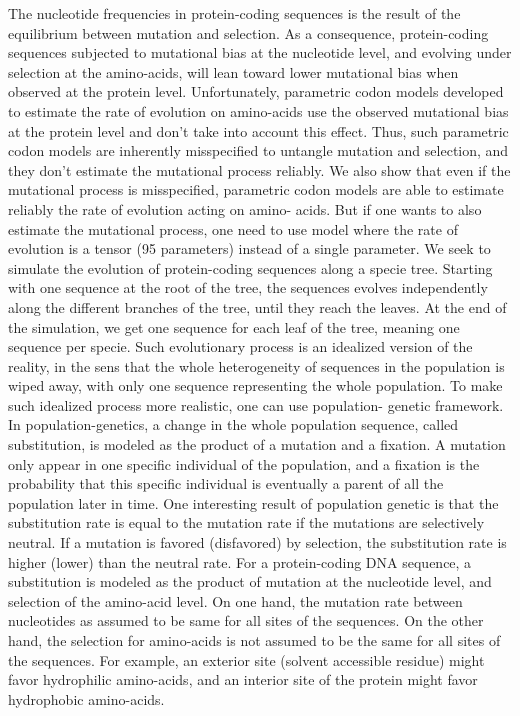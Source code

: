 The nucleotide frequencies in protein-coding sequences is the result of the equilibrium between mutation and
selection. As a consequence, protein-coding sequences subjected to mutational bias at the nucleotide level,
and evolving under selection at the amino-acids, will lean toward lower mutational bias when observed at
the protein level. Unfortunately, parametric codon models developed to estimate the rate of evolution on
amino-acids use the observed mutational bias at the protein level and don’t take into account this effect.
Thus, such parametric codon models are inherently misspecified to untangle mutation and selection, and
they don’t estimate the mutational process reliably. We also show that even if the mutational process is
misspecified, parametric codon models are able to estimate reliably the rate of evolution acting on amino-
acids. But if one wants to also estimate the mutational process, one need to use model where the rate of
evolution is a tensor (95 parameters) instead of a single parameter.
We seek to simulate the evolution of protein-coding sequences along a specie tree. Starting with one
sequence at the root of the tree, the sequences evolves independently along the different branches of the
tree, until they reach the leaves. At the end of the simulation, we get one sequence for each leaf of the
tree, meaning one sequence per specie. Such evolutionary process is an idealized version of the reality, in
the sens that the whole heterogeneity of sequences in the population is wiped away, with only one sequence
representing the whole population. To make such idealized process more realistic, one can use population-
genetic framework. In population-genetics, a change in the whole population sequence, called substitution,
is modeled as the product of a mutation and a fixation. A mutation only appear in one specific individual of
the population, and a fixation is the probability that this specific individual is eventually a parent of all the
population later in time. One interesting result of population genetic is that the substitution rate is equal to
the mutation rate if the mutations are selectively neutral. If a mutation is favored (disfavored) by selection,
the substitution rate is higher (lower) than the neutral rate.
For a protein-coding \acrshort{DNA} sequence, a substitution is modeled as the product of mutation at the nucleotide
level, and selection of the amino-acid level. On one hand, the mutation rate between nucleotides as assumed
to be same for all sites of the sequences. On the other hand, the selection for amino-acids is not assumed
to be the same for all sites of the sequences. For example, an exterior site (solvent accessible residue) might
favor hydrophilic amino-acids, and an interior site of the protein might favor hydrophobic amino-acids.


